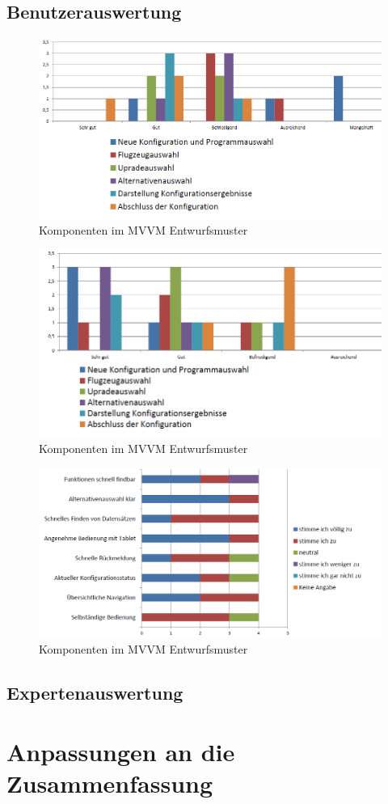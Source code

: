 \subsection{Benutzerauswertung}
\begin{figure}
\centering
\includegraphics[width=\hsize]{images/bewertung_webgui}
\caption{Komponenten im MVVM Entwurfsmuster}
\label{bewertungWebgui}
\end{figure}
\begin{figure}
\centering
\includegraphics[width=\hsize]{images/bewertung_tablet}
\caption{Komponenten im MVVM Entwurfsmuster}
\label{bewertungTablet}
\end{figure}
\begin{figure}
\centering
\includegraphics[width=\hsize]{images/bewertung_ux}
\caption{Komponenten im MVVM Entwurfsmuster}
\label{bewertungUx}
\end{figure}
\subsection{Expertenauswertung}

\section{Anpassungen an die Zusammenfassung}